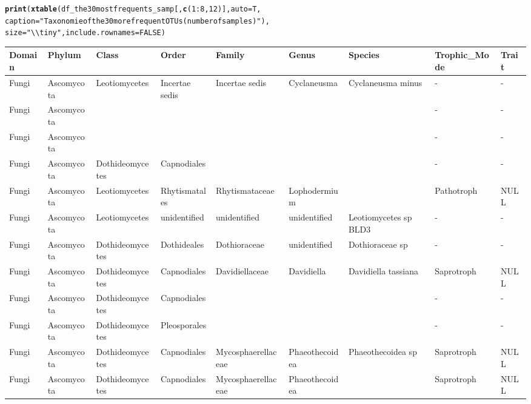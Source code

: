\documentclass[12pt]{article}\usepackage[]{graphicx}\usepackage[]{color}
\makeatletter
\newcommand{\hlnum}[1]{\textcolor[rgb]{0.686,0.059,0.569}{#1}}%
\newcommand{\hlstr}[1]{\textcolor[rgb]{0.192,0.494,0.8}{#1}}%
\newcommand{\hlopt}[1]{\textcolor[rgb]{0,0,0}{#1}}%
\newcommand{\hlstd}[1]{\textcolor[rgb]{0.345,0.345,0.345}{#1}}%
\newcommand{\hlkwc}[1]{\textcolor[rgb]{0.333,0.667,0.333}{#1}}%
\newcommand{\hlkwd}[1]{\textcolor[rgb]{0.737,0.353,0.396}{\textbf{#1}}}%
\newenvironment{kframe}{%
 \def\at@end@of@kframe{}%
 \ifinner\ifhmode%
  \def\at@end@of@kframe{\end{minipage}}%
  \begin{minipage}{\columnwidth}%
 \fi\fi%
 \def\FrameCommand##1{\hskip\@totalleftmargin \hskip-\fboxsep
 \colorbox{shadecolor}{##1}\hskip-\fboxsep
     \hskip-\linewidth \hskip-\@totalleftmargin \hskip\columnwidth}%
 \MakeFramed {\advance\hsize-\width
   \@totalleftmargin\z@ \linewidth\hsize
   \@setminipage}}%
 {\par\unskip\endMakeFramed%
 \at@end@of@kframe}
\numberwithin{figure}{section}
\makeatother
\begin{document}
\begin{landscape}
\begin{kframe}
\begin{alltt}
\hlkwd{print}\hlstd{(}\hlkwd{xtable}\hlstd{(df_the30mostfrequents_samp[,} \hlkwd{c}\hlstd{(}\hlnum{1}\hlopt{:}\hlnum{8}\hlstd{,} \hlnum{12}\hlstd{)],} \hlkwc{auto} \hlstd{= T,}
      \hlkwc{caption} \hlstd{=} \hlstr{"Taxonomie of the 30 more frequent OTUs (number of samples)"}\hlstd{),}
      \hlkwc{size} \hlstd{=} \hlstr{"\textbackslash{}\textbackslash{}tiny"}\hlstd{,} \hlkwc{include.rownames} \hlstd{=} \hlnum{FALSE}\hlstd{)}
\end{alltt}
\end{kframe}%
\begin{table}[ht]
\centering
\begingroup\tiny
\begin{tabular}{lllllllll}
  \hline
Domain & Phylum & Class & Order & Family & Genus & Species & Trophic\_Mode & Trait \\ 
  \hline
Fungi & Ascomycota & Leotiomycetes & Incertae sedis & Incertae sedis & Cyclaneusma & Cyclaneusma minus & - & - \\ 
  Fungi & Ascomycota &  &  &  &  &  & - & - \\ 
  Fungi & Ascomycota &  &  &  &  &  & - & - \\ 
  Fungi & Ascomycota & Dothideomycetes & Capnodiales &  &  &  & - & - \\ 
  Fungi & Ascomycota & Leotiomycetes & Rhytismatales & Rhytismataceae & Lophodermium &  & Pathotroph & NULL \\ 
  Fungi & Ascomycota & Leotiomycetes & unidentified & unidentified & unidentified & Leotiomycetes sp BLD3 & - & - \\ 
  Fungi & Ascomycota & Dothideomycetes & Dothideales & Dothioraceae & unidentified & Dothioraceae sp & - & - \\ 
  Fungi & Ascomycota & Dothideomycetes & Capnodiales & Davidiellaceae & Davidiella & Davidiella tassiana & Saprotroph & NULL \\ 
  Fungi & Ascomycota & Dothideomycetes & Capnodiales &  &  &  & - & - \\ 
  Fungi & Ascomycota & Dothideomycetes & Pleosporales &  &  &  & - & - \\ 
  Fungi & Ascomycota & Dothideomycetes & Capnodiales & Mycosphaerellaceae & Phaeothecoidea & Phaeothecoidea sp & Saprotroph & NULL \\ 
  Fungi & Ascomycota & Dothideomycetes & Capnodiales & Mycosphaerellaceae & Phaeothecoidea &  & Saprotroph & NULL \\ 

\end{tabular}
\end{table}
\end{landscape}
\end{document}
